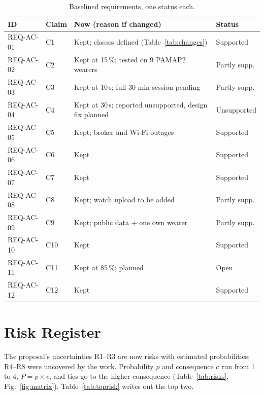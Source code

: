 \documentclass[conference]{IEEEtran}
\begin{document}
\begin{table}[!h]
\centering
\footnotesize
\setlength{\tabcolsep}{3pt}
\caption{Baselined requirements, one status each.}
\label{tab:baseline}
\begin{tabular}{p{1.45cm}p{0.75cm}p{3.75cm}p{1.35cm}}
\toprule
\textbf{ID} & \textbf{Claim} & \textbf{Now (reason if changed)} & \textbf{Status} \\
\midrule
REQ-AC-01 & C1 & Kept; classes defined (Table~\ref{tab:changes}) & Supported \\
REQ-AC-02 & C2 & Kept at 15\,\%; tested on 9 PAMAP2 wearers & Partly supp. \\
REQ-AC-03 & C3 & Kept at 10\,s; full 30-min session pending & Partly supp. \\
REQ-AC-04 & C4 & Kept at 30\,s; reported unsupported, design fix planned & Unsupported \\
REQ-AC-05 & C5 & Kept; broker and Wi-Fi outages & Supported \\
REQ-AC-06 & C6 & Kept & Supported \\
REQ-AC-07 & C7 & Kept & Supported \\
REQ-AC-08 & C8 & Kept; watch upload to be added & Partly supp. \\
REQ-AC-09 & C9 & Kept; public data + one own wearer & Partly supp. \\
REQ-AC-10 & C10 & Kept & Supported \\
REQ-AC-11 & C11 & Kept at 85\,\%; planned & Open \\
REQ-AC-12 & C12 & Kept & Supported \\
\bottomrule
\end{tabular}
\end{table}

\section{Risk Register}
\label{sec:risks}

The proposal's uncertainties R1--R3 are now risks with estimated
probabilities; R4--R8 were uncovered by the work. Probability $p$ and
consequence $c$ run from 1 to 4, $P=p\times c$, and ties go to the
higher consequence (Table~\ref{tab:risks}, Fig.~\ref{fig:matrix}).
Table~\ref{tab:toprisk} writes out the top two.
\end{document}
